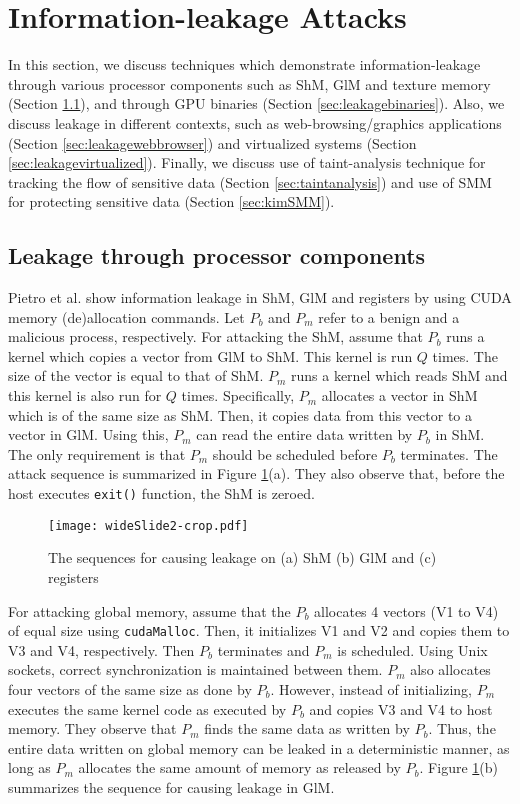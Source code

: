  \section{Information-leakage Attacks}\label{sec:dataleakage}
In this section, we discuss techniques which demonstrate information-leakage through various processor components such as ShM, GlM and texture memory (Section \ref{sec:leakcomponents}), and through GPU binaries (Section \ref{sec:leakagebinaries}). 
Also, we discuss leakage in different contexts, such as web-browsing/graphics applications (Section \ref{sec:leakagewebbrowser}) and virtualized systems (Section \ref{sec:leakagevirtualized}). Finally, we discuss use of taint-analysis technique for tracking the flow of sensitive data (Section \ref{sec:taintanalysis}) and use of SMM for protecting sensitive data (Section \ref{sec:kimSMM}).


\subsection{Leakage through processor components}\label{sec:leakcomponents}   
  
Pietro et al. \cite{pietro2016cuda} show information leakage in ShM, GlM and registers by using CUDA memory (de)allocation commands. Let $P_b$  and $P_m$ refer to a benign and a malicious process, respectively. For attacking the ShM, assume that $P_b$ runs a kernel which copies a vector from GlM to ShM. This kernel is run $Q$ times. The size of the vector is equal to that of ShM. $P_m$ runs a kernel which reads ShM and this kernel is also run for $Q$ times.   Specifically, $P_m$ allocates a vector in ShM which is of the same size as ShM. Then, it copies data from this vector to a vector in GlM. Using this, $P_m$ can read the entire data written by $P_b$ in ShM. The only requirement is that $P_m$ should be scheduled before $P_b$ terminates. The attack sequence is summarized in Figure \ref{fig:sequenceForLeakage}(a). They also observe that, before the host executes {\tt exit()} function, the ShM is zeroed. 
    
\begin{figure} [h]
\centering
\texttt{[image: wideSlide2-crop.pdf]}
\caption{The sequences for causing leakage on (a) ShM (b) GlM and (c) registers \cite{pietro2016cuda} }\label{fig:sequenceForLeakage}
\end{figure}

For attacking global memory, assume that the $P_b$ allocates 4 vectors (V1 to V4) of equal size using {\tt cudaMalloc}. Then, it initializes V1 and V2 and copies them to V3 and V4, respectively. Then $P_b$ terminates and $P_m$ is scheduled. Using Unix sockets, correct synchronization is maintained between them. $P_m$ also allocates four vectors of the same size as done by $P_b$. However, instead of initializing, $P_m$ executes the same kernel code as executed by $P_b$ and copies V3 and V4 to host memory. They observe that $P_m$ finds the same data as written by $P_b$. Thus, the entire data written on global memory can be leaked in a deterministic manner, as long as $P_m$ allocates the same amount of memory as released by $P_b$. Figure \ref{fig:sequenceForLeakage}(b) summarizes the sequence for causing leakage in GlM. 

